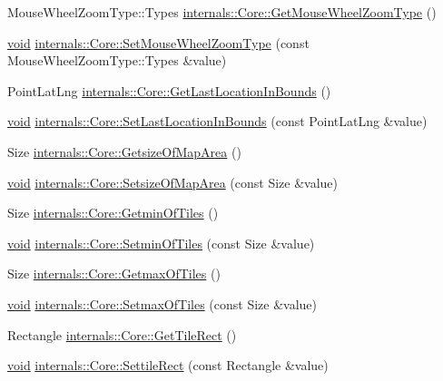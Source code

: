 \begin{DoxyCompactItemize}
\item 
\-Mouse\-Wheel\-Zoom\-Type\-::\-Types \hyperlink{group___o_p_map_widget_gaaf45ca5113dc967072f68d3785b6089b}{internals\-::\-Core\-::\-Get\-Mouse\-Wheel\-Zoom\-Type} ()
\item 
\hyperlink{group___u_a_v_objects_plugin_ga444cf2ff3f0ecbe028adce838d373f5c}{void} \hyperlink{group___o_p_map_widget_ga605f19f8d878c649a0c0fe7aefde25c7}{internals\-::\-Core\-::\-Set\-Mouse\-Wheel\-Zoom\-Type} (const \-Mouse\-Wheel\-Zoom\-Type\-::\-Types \&value)
\item 
\-Point\-Lat\-Lng \hyperlink{group___o_p_map_widget_ga9869340265138d874099cdffed04d95a}{internals\-::\-Core\-::\-Get\-Last\-Location\-In\-Bounds} ()
\item 
\hyperlink{group___u_a_v_objects_plugin_ga444cf2ff3f0ecbe028adce838d373f5c}{void} \hyperlink{group___o_p_map_widget_ga49e6ed17c97e596b9fb3103b63816212}{internals\-::\-Core\-::\-Set\-Last\-Location\-In\-Bounds} (const \-Point\-Lat\-Lng \&value)
\item 
\-Size \hyperlink{group___o_p_map_widget_gafbcd83a2c5548f22c6cbb52a09ff402d}{internals\-::\-Core\-::\-Getsize\-Of\-Map\-Area} ()
\item 
\hyperlink{group___u_a_v_objects_plugin_ga444cf2ff3f0ecbe028adce838d373f5c}{void} \hyperlink{group___o_p_map_widget_ga2e491fd5e0849b99f2d9d180c71cb68d}{internals\-::\-Core\-::\-Setsize\-Of\-Map\-Area} (const \-Size \&value)
\item 
\-Size \hyperlink{group___o_p_map_widget_gaa4181b7edf2df8de57265234f1068b67}{internals\-::\-Core\-::\-Getmin\-Of\-Tiles} ()
\item 
\hyperlink{group___u_a_v_objects_plugin_ga444cf2ff3f0ecbe028adce838d373f5c}{void} \hyperlink{group___o_p_map_widget_gaf34f47548612f5dcf275002aa9b3466c}{internals\-::\-Core\-::\-Setmin\-Of\-Tiles} (const \-Size \&value)
\item 
\-Size \hyperlink{group___o_p_map_widget_gaa2cd678b4016f6334bfef3c1c8ac3b03}{internals\-::\-Core\-::\-Getmax\-Of\-Tiles} ()
\item 
\hyperlink{group___u_a_v_objects_plugin_ga444cf2ff3f0ecbe028adce838d373f5c}{void} \hyperlink{group___o_p_map_widget_gab059331f4276245f3415728687b72659}{internals\-::\-Core\-::\-Setmax\-Of\-Tiles} (const \-Size \&value)
\item 
\-Rectangle \hyperlink{group___o_p_map_widget_gaff36128b86944502f81b27d0d9ca418b}{internals\-::\-Core\-::\-Get\-Tile\-Rect} ()
\item 
\hyperlink{group___u_a_v_objects_plugin_ga444cf2ff3f0ecbe028adce838d373f5c}{void} \hyperlink{group___o_p_map_widget_ga6305b3465177838582206b9911561cf9}{internals\-::\-Core\-::\-Settile\-Rect} (const \-Rectangle \&value)

\end{DoxyCompactItemize}
